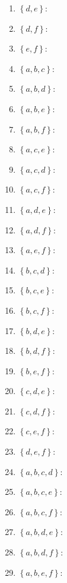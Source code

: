 \documentclass{article}
\begin{document}
\begin{enumerate}
\begin{enumerate}
\item $\left\{ d,e \right\}$:
\item $\left\{ d,f \right\}$:

\item $\left\{ e,f \right\}$:

\item $\left\{ a,b,c \right\}$:
\item $\left\{ a,b,d \right\}$:
\item $\left\{ a,b,e \right\}$:
\item $\left\{ a,b,f \right\}$:

\item $\left\{ a,c,e \right\}$:
\item $\left\{ a,c,d \right\}$:
\item $\left\{ a,c,f \right\}$:

\item $\left\{ a,d,e \right\}$:
\item $\left\{ a,d,f \right\}$:

\item $\left\{ a,e,f \right\}$:

\item $\left\{ b,c,d \right\}$:
\item $\left\{ b,c,e \right\}$:
\item $\left\{ b,c,f \right\}$:

\item $\left\{ b,d,e \right\}$:
\item $\left\{ b,d,f \right\}$:

\item $\left\{ b,e,f \right\}$:

\item $\left\{ c,d,e \right\}$:
\item $\left\{ c,d,f \right\}$:

\item $\left\{ c,e,f \right\}$:

\item $\left\{ d,e,f \right\}$:

\item $\left\{ a,b,c,d \right\}$:
\item $\left\{ a,b,c,e \right\}$:
\item $\left\{ a,b,c,f \right\}$:

\item $\left\{ a,b,d,e \right\}$:
\item $\left\{ a,b,d,f \right\}$:

\item $\left\{ a,b,e,f \right\}$:


\end{enumerate}
\end{enumerate}
\end{document}
